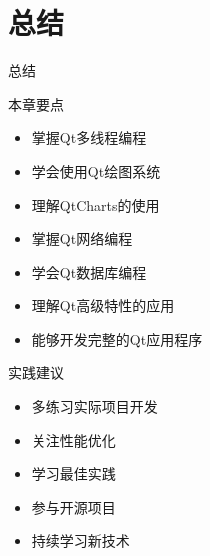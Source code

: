 \documentclass[UTF8,aspectratio=169]{beamer}
\begin{document}
\section{总结}

\begin{frame}{总结}
    \begin{block}{本章要点}
        \begin{itemize}
            \item 掌握Qt多线程编程
            \item 学会使用Qt绘图系统
            \item 理解QtCharts的使用
            \item 掌握Qt网络编程
            \item 学会Qt数据库编程
            \item 理解Qt高级特性的应用
            \item 能够开发完整的Qt应用程序
        \end{itemize}
    \end{block}

    \begin{block}{实践建议}
        \begin{itemize}
            \item 多练习实际项目开发
            \item 关注性能优化
            \item 学习最佳实践
            \item 参与开源项目
            \item 持续学习新技术
        \end{itemize}
    \end{block}
\end{frame}
\end{document}
